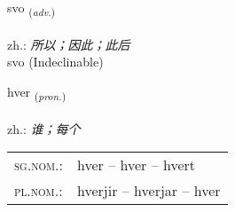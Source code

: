 \documentclass[frontgrid, backgrid]{flacards}\usepackage[]{graphicx}\usepackage[]{xcolor}
\begin{document}
\renewcommand{\blhead}{\vskip5pt {\small\bfseries\footnotesize Atviksorð | 副词 }}
\renewcommand{\bcfoot}{\vskip5pt \hspace{2pt}{\small\bfseries\footnotesize 1K}}


{svo \small{\textsubscript{(\textit{adv.})}} \\[1ex]
\textphonetic{[svɔː]} \\
zh.: \emph{所以；因此；此后} \\  [2ex]
svo (Indeclinable)}

\renewcommand{\flhead}{\vskip5pt \fboxsep=0pt {\small\bfseries\footnotesize Fornafn | 代词}}
\renewcommand{\fcfoot}{\vskip5pt \fboxsep=0pt \hspace{2pt}{\small\bfseries\footnotesize 1K}}

\renewcommand{\blhead}{\vskip5pt {\small\bfseries\footnotesize Fornafn | 代词 }}
\renewcommand{\bcfoot}{\vskip5pt \hspace{2pt}{\small\bfseries\footnotesize 1K}}


{hver \small{\textsubscript{(\textit{pron.})}} \\[1ex] %
\textphonetic{[kʰvɛr]} \\
zh.: \emph{谁；每个} \\  [2ex]
\renewcommand*{\arraystretch}{0.8}
\begin{tabular}{ll}
\textsc{sg.nom.}: & hver  --  hver -- hvert \\ 
\textsc{pl.nom.}: & hverjir -- hverjar -- hver
\end{tabular}
}

\renewcommand{\flhead}{\vskip5pt \fboxsep=0pt {\small\bfseries\footnotesize Sagnorð | 动词}}
\renewcommand{\fcfoot}{\vskip5pt \fboxsep=0pt \hspace{2pt}{\small\bfseries\footnotesize 1K}}

\renewcommand{\blhead}{\vskip5pt {\small\bfseries\footnotesize Sagnorð | 动词 }}
\renewcommand{\bcfoot}{\vskip5pt \hspace{2pt}{\small\bfseries\footnotesize 1K}}
\end{document}
